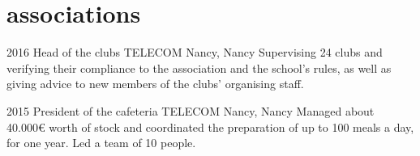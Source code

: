\documentclass[]{lemaki-cv}
\begin{document}

		\section{associations}

		\begin{entrylist}


			\entry
			{2016}
			{Head of the clubs}
			{TELECOM Nancy, Nancy}
			{Supervising 24 clubs and verifying their compliance to the association and
			the school's rules, as well as giving advice to new members of the clubs'
			organising staff.}


			\entry
			{2015}
			{President of the cafeteria}
			{TELECOM Nancy, Nancy}
			{Managed about 40.000€ worth of stock and coordinated the preparation of up
			to 100 meals a day, for one year. Led a team of 10 people.}


		\end{entrylist}
\end{document}
